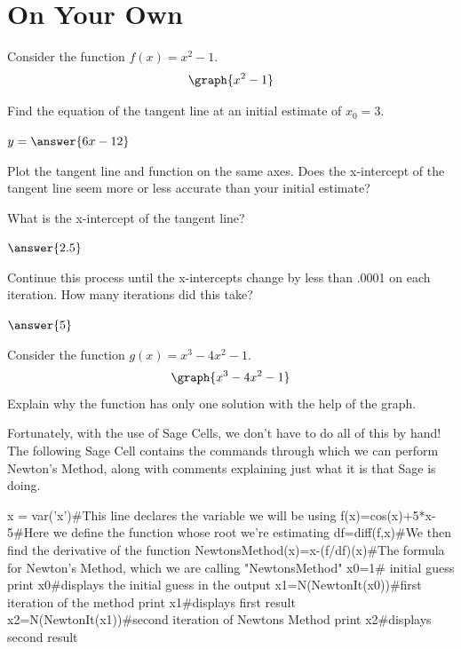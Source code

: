 \documentclass{ximera}
\begin{document}
\section{On Your Own}
\begin{question}
Consider the function $f(x) = x^2-1$.
\[
\graph{x^2-1}
\]

Find the equation of the tangent line at an initial estimate of $x_0=3$.

$y = \answer{6x-12}$

Plot the tangent line and function on the same axes. Does the x-intercept of the tangent line seem more or less accurate than your initial estimate?

\begin{multipleChoice}
\end{multipleChoice}

What is the x-intercept of the tangent line?

$\answer{2.5}$
\begin{onlineOnly}
\begin{sageCell}

\end{sageCell}
\end{onlineOnly}
Continue this process until the x-intercepts change by less than .0001 on each iteration. How many iterations did this take?

$\answer{5}$
\end{question}
\begin{question}
Consider the function $g(x) = x^3-4x^2-1$.
\[
\graph{x^3-4x^2-1}
\]
Explain why the function has only one solution with the help of the graph.

\begin{freeResponse}
\end{freeResponse}
\end{question}

Fortunately, with the use of Sage Cells, we don't have to do all of this by hand! The following Sage Cell contains the commands through which we can perform Newton's Method, along with comments explaining just what it is that Sage is doing.

\begin{onlineOnly}
\begin{sageCell}
x = var('x')#This line declares the variable we will be using
f(x)=cos(x)+5*x-5#Here we define the function whose root we're estimating
df=diff(f,x)#We then find the derivative of the function
NewtonsMethod(x)=x-(f/df)(x)#The formula for Newton's Method, which we are calling "NewtonsMethod"
x0=1# initial guess
print x0#displays the initial guess in the output
x1=N(NewtonIt(x0))#first iteration of the method
print x1#displays first result
x2=N(NewtonIt(x1))#second iteration of Newtons Method
print x2#displays second result
\end{sageCell}
\end{onlineOnly}
\end{document}
